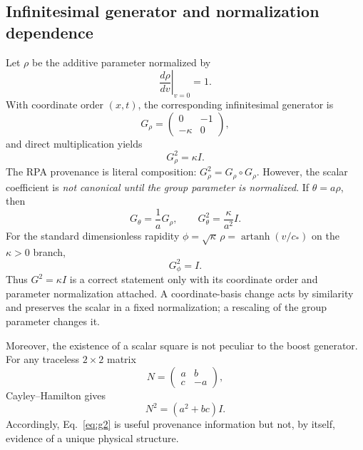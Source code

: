 \documentclass[11pt,a4paper]{article}
\newcommand{\kpar}{\kappa}
\begin{document}
\subsection{Infinitesimal generator and normalization dependence}
Let $\rho$ be the additive parameter normalized by
\begin{equation}
\left.\frac{d\rho}{dv}\right|_{v=0}=1.
\end{equation}
With coordinate order $(x,t)$, the corresponding infinitesimal generator is
\begin{equation}
G_\rho=
\begin{pmatrix}
0 & -1\\
-\kpar & 0
\end{pmatrix},
\end{equation}
and direct multiplication yields
\begin{equation}
\boxed{G_\rho^2=\kpar I}.
\label{eq:g2}
\end{equation}
The RPA provenance is literal composition: $G_\rho^2=G_\rho\circ G_\rho$. However, the scalar coefficient is \emph{not canonical until the group parameter is normalized}. If $\theta=a\rho$, then
\begin{equation}
G_\theta=\frac1aG_\rho,
\qquad
G_\theta^2=\frac{\kpar}{a^2}I.
\end{equation}
For the standard dimensionless rapidity $\phi=\sqrt{\kpar}\,\rho=\operatorname{artanh}(v/c_*)$ on the $\kpar>0$ branch,
\begin{equation}
\boxed{G_\phi^2=I}.
\end{equation}
Thus $G^2=\kpar I$ is a correct statement only with its coordinate order and parameter normalization attached. A coordinate-basis change acts by similarity and preserves the scalar in a fixed normalization; a rescaling of the group parameter changes it.

Moreover, the existence of a scalar square is not peculiar to the boost generator. For any traceless $2\times2$ matrix
\begin{equation}
N=\begin{pmatrix}a&b\\c&-a\end{pmatrix},
\end{equation}
Cayley--Hamilton gives
\begin{equation}
\boxed{N^2=(a^2+bc)I}.
\label{eq:tracelessCH}
\end{equation}
Accordingly, Eq.~\eqref{eq:g2} is useful provenance information but not, by itself, evidence of a unique physical structure.
\end{document}
